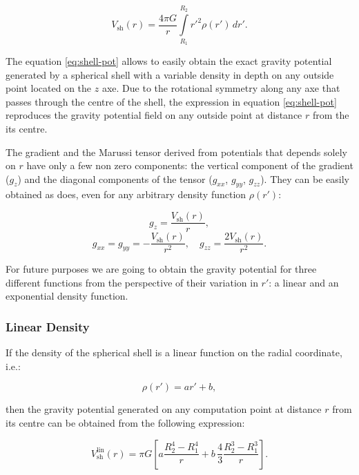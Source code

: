 \documentclass[extra]{gji}
\begin{document}
\begin{equation}
    V_\text{sh}(r) = \frac{4\pi G}{r}
    \int\limits_{R_1}^{R_2} {r'}^2 \rho(r') \, dr'.
\label{eq:shell-pot}
\end{equation}

The equation \ref{eq:shell-pot} allows to easily obtain the exact gravity potential generated by a spherical shell with a variable density in depth on any outside point located on the $z$ axe.
Due to the rotational symmetry along any axe that passes through the centre of the shell, the expression in equation \ref{eq:shell-pot} reproduces the gravity potential field on any outside point at distance $r$ from the its centre.

The gradient and the Marussi tensor derived from potentials that depends solely on $r$ have only a few non zero components: the vertical component of the gradient ($g_z$) and the diagonal components of the tensor ($g_{xx}$, $g_{yy}$, $g_{zz}$).
They can be easily obtained as \citet{Grombein2013} does, even for any arbitrary density function $\rho(r')$:

\begin{equation}
    g_z = \frac{V_\text{sh}(r)}{r},
\end{equation}
\begin{equation}
    g_{xx} = g_{yy} = -\frac{V_\text{sh}(r)}{r^2}, \quad
    g_{zz} = \frac{2V_\text{sh}(r)}{r^2}.
\end{equation}

For future purposes we are going to obtain the gravity potential for three different functions from the perspective of their variation in $r'$: a linear and an exponential density function.


\subsubsection{Linear Density}

If the density of the spherical shell is a linear function on the radial coordinate, i.e.:

\begin{equation}
    \rho(r') = ar' + b,
\end{equation}

\noindent then the gravity potential generated on any computation point at distance $r$ from its centre can be obtained from the following expression:

\begin{equation}
    V_\text{sh}^\text{lin}(r) = \pi G \left[ 
    a \frac{R_2^4 - R_1^4}{r} +
    b \,\frac{4}{3} \frac{R_2^3 - R_1^3}{r} \right].
    \label{eq:shell-pot-linear}
\end{equation}
\end{document}
